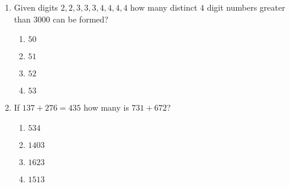\documentclass[journal]{IEEEtran}
\begin{document}
\begin{enumerate}
\begin{enumerate}
    \end{enumerate}
    \item Given digits $2,2,3,3,3,4,4,4,4$ how many distinct $4$ digit numbers greater than $3000$ can be formed?
    \begin{enumerate}
        \item $50$
        \item $51$
        \item $52$
        \item $53$
    \end{enumerate}
    \item If $137+276=435$ how many is $731+672$?
    \begin{enumerate}
        \item $534$
        \item $1403$
        \item $1623$
        \item $1513$
    \end{enumerate}
\end{enumerate}
\end{document}
